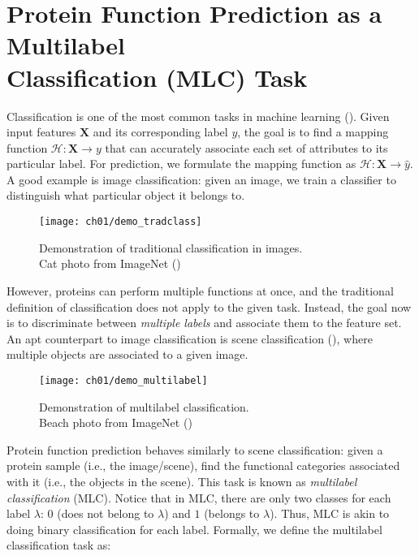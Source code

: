 \section[Protein Function Prediction as a Multilabel Classification Task]
{Protein Function Prediction as a Multilabel\\Classification  (MLC) Task}
\label{MultilabelClassification}

\par Classification is one of the most common tasks in machine learning
(\cite{herrera2016multilabel}). Given input features $\mathbf{X}$ and its
corresponding label $y$, the goal is to find a mapping function $\mathcal{H}:
\mathbf{X} \rightarrow y$ that can accurately associate each set of
attributes to its particular label. For prediction, we formulate the mapping
function as $\mathcal{H}: \mathbf{X} \rightarrow \widehat{y}$. A good example
is image classification: given an image, we train a classifier to distinguish
what particular object it belongs to.

\begin{figure}[!h]
  \centering
  \texttt{[image: ch01/demo\_tradclass]}
  \caption[Demonstration of traditional classification in images]
  {Demonstration of traditional classification in images.\\Cat photo
  from ImageNet (\cite{russakovsky2015imagenet})}
  \label{demo:traditional}
\end{figure}

\par However, proteins can perform multiple functions at once, and the
traditional definition of classification does not apply to the given task.
Instead, the goal now is to discriminate between \textit{multiple labels} and
associate them to the feature set. An apt counterpart to image classification
is scene classification (\cite{boutell2004learning}), where multiple objects
are associated to a given image.

\begin{figure}[!h]
  \centering
  \texttt{[image: ch01/demo\_multilabel]}
  \caption[Demonstration of multilabel classification]
  {Demonstration of multilabel classification.\\Beach photo
  from ImageNet (\cite{russakovsky2015imagenet})}
  \label{demo:multilabel}
\end{figure}

\par Protein function prediction behaves similarly to scene classification:
given a protein sample (i.e., the image/scene), find the functional categories
associated with it (i.e., the objects in the scene).  This task is known as
\textit{multilabel classification} (MLC). Notice that in MLC, there are only
two classes for each label $\lambda$: $0$ (does not belong to $\lambda$) and
$1$ (belongs to $\lambda$). Thus, MLC is akin to doing binary classification
for each label. Formally, we define the multilabel classification task as:


